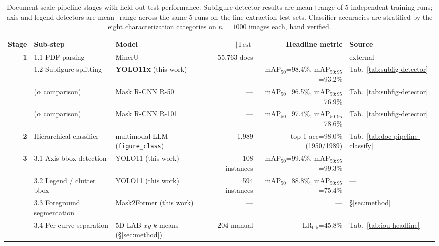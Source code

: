 \documentclass{article}
\begin{document}
\begin{table}[h]
\centering
\caption{Document-scale pipeline stages with held-out test
performance. Subfigure-detector results are mean$\pm$range of $5$
independent training runs; axis and legend detectors are
mean$\pm$range across the same $5$ runs on the line-extraction
test sets. Classifier accuracies are stratified by the eight
characterization categories on $n{=}1000$ images each, hand
verified.}
\label{tab:doc-pipeline-stages}
\scriptsize
\setlength{\tabcolsep}{2pt}
\begin{tabular}{rllrrl}
\toprule
Stage & Sub-step & Model & $|\text{Test}|$ & Headline metric & Source \\
\midrule
\multirow{4}{*}{\textbf{1}} & 1.1 PDF parsing            & MinerU                                  & 55{,}763 docs & --- & external                       \\
                            & 1.2 Subfigure splitting    & \textbf{YOLO11x} (this work)            & --- & mAP$_{50}$=98.4\%, mAP$_{50:95}$=93.2\% & Tab.~\ref{tab:subfig-detector} \\
                            & ($\alpha$ comparison)      & Mask R-CNN R-50                         & --- & mAP$_{50}$=96.5\%, mAP$_{50:95}$=76.9\% & Tab.~\ref{tab:subfig-detector} \\
                            & ($\alpha$ comparison)      & Mask R-CNN R-101                        & --- & mAP$_{50}$=97.4\%, mAP$_{50:95}$=78.6\% & Tab.~\ref{tab:subfig-detector} \\
\midrule
\textbf{2} & Hierarchical classifier & multimodal LLM (\texttt{figure\_class}) & 1{,}989 & top-1 acc=98.0\% (1950/1989) & Tab.~\ref{tab:doc-pipeline-classify} \\
\midrule
\multirow{4}{*}{\textbf{3}} & 3.1 Axis bbox detection    & YOLO11 (this work)                      & 108 instances & mAP$_{50}$=99.4\%, mAP$_{50:95}$=99.3\% & --- \\
                            & 3.2 Legend / clutter bbox  & YOLO11 (this work)                      & 594 instances & mAP$_{50}$=88.8\%, mAP$_{50:95}$=75.4\% & --- \\
                            & 3.3 Foreground segmentation & Mask2Former (this work)                & --- & --- & \S\ref{sec:method}                            \\
                            & 3.4 Per-curve separation   & 5D LAB-$xy$ $k$-means (\S\ref{sec:method}) & 204 manual & $\mathrm{LR}_{0.5}$=45.8\% & Tab.~\ref{tab:iou-headline} \\
\bottomrule
\end{tabular}
\end{table}
\end{document}
